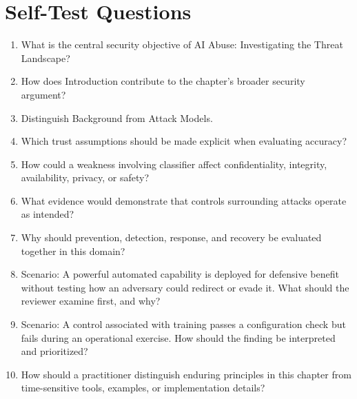 \documentclass[11pt]{article}
\begin{document}
\section*{Self-Test Questions}
\begin{enumerate}
\item What is the central security objective of AI Abuse: Investigating the Threat Landscape?
\item How does Introduction contribute to the chapter's broader security argument?
\item Distinguish Background from Attack Models.
\item Which trust assumptions should be made explicit when evaluating accuracy?
\item How could a weakness involving classifier affect confidentiality, integrity, availability, privacy, or safety?
\item What evidence would demonstrate that controls surrounding attacks operate as intended?
\item Why should prevention, detection, response, and recovery be evaluated together in this domain?
\item Scenario: A powerful automated capability is deployed for defensive benefit without testing how an adversary could redirect or evade it. What should the reviewer examine first, and why?
\item Scenario: A control associated with training passes a configuration check but fails during an operational exercise. How should the finding be interpreted and prioritized?
\item How should a practitioner distinguish enduring principles in this chapter from time-sensitive tools, examples, or implementation details?
\end{enumerate}
\end{document}
